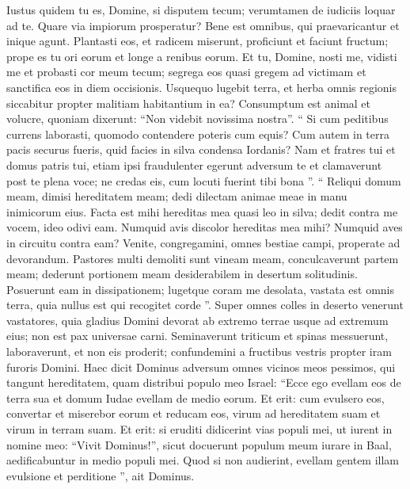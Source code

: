 \begin{biblechapter}
\begin{biblechapter}
\begin{biblechapter}
\begin{biblechapter}
\begin{biblechapter}
\begin{biblechapter}
\begin{biblechapter}
\begin{biblechapter}
\begin{biblechapter}
\begin{biblechapter}
\begin{biblechapter}
\begin{biblechapter}
\verse Iustus quidem tu es, Domine, si disputem tecum;
 verumtamen de iudiciis loquar ad te.
 Quare via impiorum prosperatur?
 Bene est omnibus, qui praevaricantur et inique agunt.
 \verse Plantasti eos, et radicem miserunt,
 proficiunt et faciunt fructum;
 prope es tu ori eorum
 et longe a renibus eorum.
 \verse Et tu, Domine, nosti me, vidisti me
 et probasti cor meum tecum;
 segrega eos quasi gregem ad victimam
 et sanctifica eos in diem occisionis.
 \verse Usquequo lugebit terra,
 et herba omnis regionis siccabitur
 propter malitiam habitantium in ea?
 Consumptum est animal et volucre,
 quoniam dixerunt: “Non videbit novissima nostra”.
 \verse “ Si cum peditibus currens laborasti,
 quomodo contendere poteris cum equis?
 Cum autem in terra pacis securus fueris,
 quid facies in silva condensa Iordanis?
 \verse Nam et fratres tui et domus patris tui,
 etiam ipsi fraudulenter egerunt adversum te
 et clamaverunt post te plena voce;
 ne credas eis, cum locuti fuerint tibi bona ”.
 \verse “ Reliqui domum meam,
 dimisi hereditatem meam;
 dedi dilectam animae meae
 in manu inimicorum eius.
 \verse Facta est mihi hereditas mea
 quasi leo in silva;
 dedit contra me vocem, ideo odivi eam.
 \verse Numquid avis discolor hereditas mea mihi?
 Numquid aves in circuitu contra eam?
 Venite, congregamini, omnes bestiae campi,
 properate ad devorandum.
 \verse Pastores multi demoliti sunt vineam meam,
 conculcaverunt partem meam;
 dederunt portionem meam desiderabilem
 in desertum solitudinis.
 \verse Posuerunt eam in dissipationem;
 lugetque coram me desolata,
 vastata est omnis terra,
 quia nullus est qui recogitet corde ”.
 \verse Super omnes colles in deserto venerunt vastatores,
 quia gladius Domini devorat
 ab extremo terrae usque ad extremum eius;
 non est pax universae carni.
 \verse Seminaverunt triticum et spinas messuerunt,
 laboraverunt, et non eis proderit;
 confundemini a fructibus vestris
 propter iram furoris Domini.
 \verse Haec dicit Dominus adversum omnes vicinos meos pessimos, qui tangunt hereditatem, quam distribui populo meo Israel: “Ecce ego evellam eos de terra sua et domum Iudae evellam de medio eorum. 
\verse Et erit: cum evulsero eos, convertar et miserebor eorum et reducam eos, virum ad hereditatem suam et virum in terram suam. 
\verse Et erit: si eruditi didicerint vias populi mei, ut iurent in nomine meo: “Vivit Dominus!”, sicut docuerunt populum meum iurare in Baal, aedificabuntur in medio populi mei. 
\verse Quod si non audierint, evellam gentem illam evulsione et perditione ”, ait Dominus.
 

\end{biblechapter}
\end{biblechapter}
\end{biblechapter}
\end{biblechapter}
\end{biblechapter}
\end{biblechapter}
\end{biblechapter}
\end{biblechapter}
\end{biblechapter}
\end{biblechapter}
\end{biblechapter}
\end{biblechapter}
